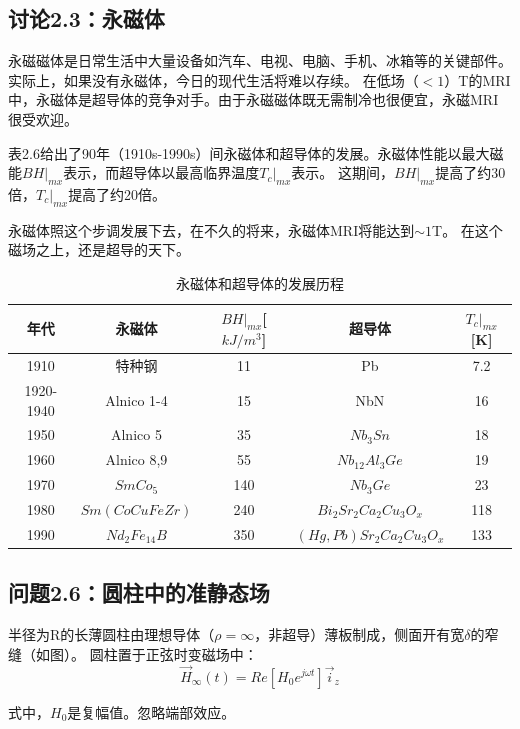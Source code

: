 \subsection{讨论2.3：永磁体}
永磁磁体是日常生活中大量设备如汽车、电视、电脑、手机、冰箱等的关键部件。实际上，如果没有永磁体，今日的现代生活将难以存续。
在低场（$<1$）T的MRI中，永磁体是超导体的竞争对手。由于永磁磁体既无需制冷也很便宜，永磁MRI很受欢迎。

表2.6给出了90年（1910s-1990s）间永磁体和超导体的发展。永磁体性能以最大磁能$BH|_{mx}$表示，而超导体以最高临界温度$T_c|_{mx}$表示。
这期间，$BH|_{mx}$提高了约30倍，$T_c|_{mx}$提高了约20倍。

永磁体照这个步调发展下去，在不久的将来，永磁体MRI将能达到$\sim 1$T。
在这个磁场之上，还是超导的天下。

\begin{table}[]
\centering
\caption{永磁体和超导体的发展历程}
\label{磁体和超导体的发展}
\begin{tabular}{|c|c|c|c|c|}
\hline
年代        & 永磁体 & $BH|_{mx}$[$kJ/m^3$] & 超导体 & $T_c|_{mx}$[K]   \\ \hline
1910      &  特种钢   & 11       &  Pb   & 7.2 \\ \hline
1920-1940 &  Alnico 1-4   & 15       &   NbN  & 16  \\ \hline
1950      &   Alnico 5  & 35       &    $Nb_3 Sn$ & 18  \\ \hline
1960      &   Alnico 8,9  & 55       &   $Nb_{12}Al_3 Ge$  &   19  \\ \hline
1970      &   $SmCo_5 $  & 140      &  $Nb_3Ge$   & 23    \\ \hline
1980      &   $Sm(CoCuFeZr)  $& 240      &  $Bi_2 Sr_2 Ca_2 Cu_3 O_x$   & 118 \\ \hline
1990      &  $Nd_2Fe_{14}B$   & 350      & $(Hg, Pb) Sr_2 Ca_2 Cu_3 O_x$    & 133 \\ \hline
\end{tabular}
\end{table}



\subsection{问题2.6：圆柱中的准静态场}
半径为R的长薄圆柱由理想导体（$\rho=\infty$，非超导）薄板制成，侧面开有宽$\delta$的窄缝（如图）。
圆柱置于正弦时变磁场中：
$$\vec{H}_\infty(t)=Re[H_0 e^{j\omega t}] \vec{i}_z$$

式中，$H_0$是复幅值。忽略端部效应。

